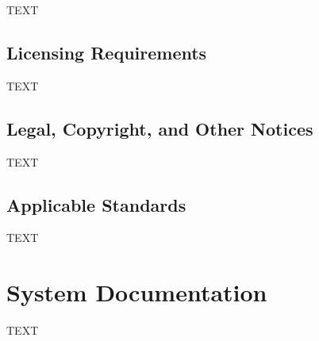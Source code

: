 TEXT

\subsection{Licensing Requirements}

TEXT

\subsection{Legal, Copyright, and Other Notices}

TEXT

\subsection{Applicable Standards}

TEXT

\section{System Documentation}

TEXT


